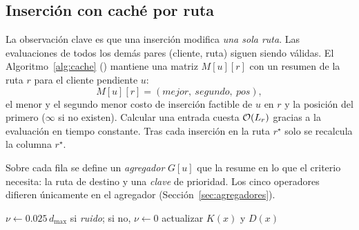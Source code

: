 \subsection{Inserción con caché por ruta}
\label{sec:cache}

La observación clave es que una inserción modifica \emph{una sola ruta}. Las evaluaciones de
todos los demás pares (cliente, ruta) siguen siendo válidas. El
Algoritmo~\ref{alg:cache} () mantiene una matriz
$M[u][r]$ con un resumen de la ruta $r$ para el cliente pendiente $u$:
\[
M[u][r]=(\textit{mejor},\ \textit{segundo},\ \textit{pos}),
\]
el menor y el segundo menor costo de inserción factible de $u$ en $r$ y la posición del
primero ($\infty$ si no existen). Calcular una entrada cuesta $\mathcal{O}(L_r)$ gracias a la
evaluación en tiempo constante. Tras cada inserción en la ruta $r^\star$ solo se recalcula la
columna $r^\star$.

Sobre cada fila se define un \emph{agregador} $G[u]$ que la resume en lo que el criterio
necesita: la ruta de destino y una \emph{clave} de prioridad. Los cinco operadores difieren
únicamente en el agregador (Sección~\ref{sec:agregadores}).

\begin{algorithm}[H]
\caption{$\langle G\rangle$ ()}
\label{alg:cache}
$\nu\gets 0.025\,d_{\max}$ si \textit{ruido}; si no, $\nu\gets 0$ 
actualizar $K(x)$ y $D(x)$\;
\end{algorithm}

